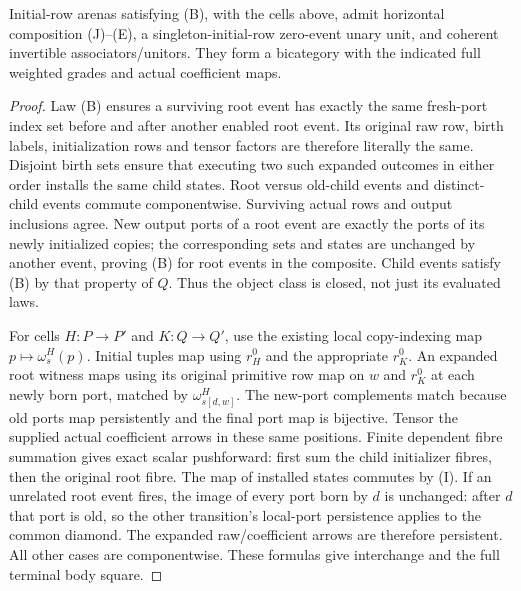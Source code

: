 \documentclass[11pt]{article}
\begin{document}
\begin{theorem}
Initial-row arenas satisfying (B), with the cells above, admit horizontal composition (J)--(E), a singleton-initial-row zero-event unary unit, and coherent invertible associators/unitors. They form a bicategory with the indicated full weighted grades and actual coefficient maps.
\end{theorem}
\begin{proof}
Law (B) ensures a surviving root event has exactly the same fresh-port index set before and after another enabled root event. Its original raw row, birth labels, initialization rows and tensor factors are therefore literally the same. Disjoint birth sets ensure that executing two such expanded outcomes in either order installs the same child states. Root versus old-child events and distinct-child events commute componentwise. Surviving actual rows and output inclusions agree. New output ports of a root event are exactly the ports of its newly initialized copies; the corresponding sets and states are unchanged by another event, proving (B) for root events in the composite. Child events satisfy (B) by that property of $Q$. Thus the object class is closed, not just its evaluated laws.

For cells $H:P\to P'$ and $K:Q\to Q'$, use the existing local copy-indexing map $p\mapsto\omega^H_s(p)$. Initial tuples map using $r_H^0$ and the appropriate $r_K^0$. An expanded root witness maps using its original primitive row map on $w$ and $r_K^0$ at each newly born port, matched by $\omega^H_{s[d,w]}$. The new-port complements match because old ports map persistently and the final port map is bijective. Tensor the supplied actual coefficient arrows in these same positions. Finite dependent fibre summation gives exact scalar pushforward: first sum the child initializer fibres, then the original root fibre. The map of installed states commutes by (I). If an unrelated root event fires, the image of every port born by $d$ is unchanged: after $d$ that port is old, so the other transition's local-port persistence applies to the common diamond. The expanded raw/coefficient arrows are therefore persistent. All other cases are componentwise. These formulas give interchange and the full terminal body square.


\end{proof}
\end{document}
